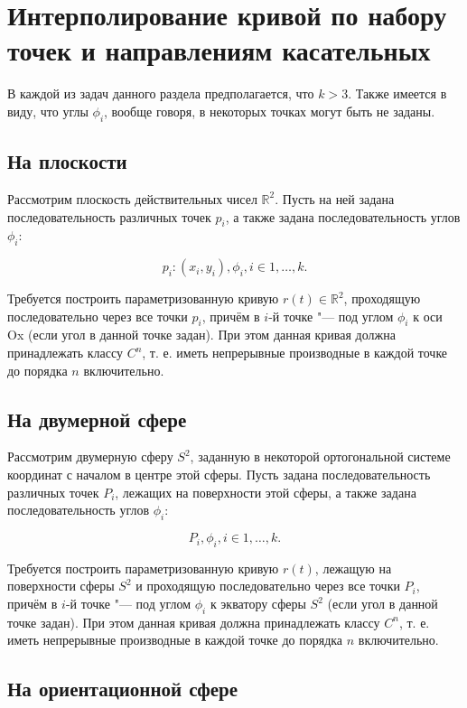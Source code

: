\section{Интерполирование кривой по набору точек и направлениям касательных}

В каждой из задач данного раздела предполагается, что $k>3$. Также имеется в виду, что углы $\phi_i$, вообще говоря,
в некоторых точках могут быть не заданы.

\subsection*{На плоскости}

Рассмотрим плоскость действительных чисел $\mathbb{R}^2$. Пусть на ней задана последовательность различных точек
$p_i$, а также задана последовательность углов $\phi_i$:

$${p_i: (x_i, y_i)}, {\phi_i}, i \in {1, \dots, k}.$$

Требуется построить параметризованную кривую $r(t) \in \mathbb{R}^2$, проходящую последовательно через все точки
$p_i$, причём в $i$-й точке "--- под углом $\phi_i$ к оси Ox (если угол в данной точке задан). При этом данная кривая
должна принадлежать классу $C^n$, т. е. иметь непрерывные производные в каждой точке до порядка $n$ включительно.

\subsection*{На двумерной сфере}

Рассмотрим двумерную сферу $S^2$, заданную в некоторой ортогональной системе координат с началом в центре этой сферы.
Пусть задана последовательность различных точек $P_i$, лежащих на поверхности этой сферы, а также задана
последовательность углов $\phi_i$:

$${P_i}, {\phi_i}, i \in {1, \dots, k}.$$

Требуется построить параметризованную кривую $r(t)$, лежащую на поверхности сферы $S^2$ и проходящую последовательно
через все точки $P_i$, причём в $i$-й точке "--- под углом $\phi_i$ к экватору сферы $S^2$ (если угол в данной точке
задан). При этом данная кривая должна принадлежать классу $C^n$, т. е. иметь непрерывные производные в каждой точке
до порядка $n$ включительно.

\subsection*{На ориентационной сфере}

